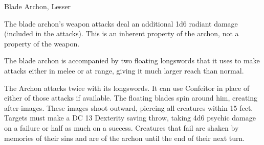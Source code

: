 \begin{DndMonster}{Blade Archon, Lesser}
	\DndMonsterBasics[armor-class={15 (scale mail)}, hit-points={60}, speed={30 ft., fly 50 ft. (hover)}]
	\DndMonsterDetails[skills={Athletics +6}, damage-resistances={radiant}, damage-immunities={poison}, senses={darkvision 60 ft., passive Perception 19}, languages={celestial}, challenge={4:3}]

	 The blade archon's weapon attacks deal an additional 1d6 radiant damage (included in the attacks). This is an inherent property of the archon, not a property of the weapon.
	
	 The blade archon is accompanied by two floating longswords that it uses to make attacks either in melee or at range, giving it much larger reach than normal.
	
	 The Archon attacks twice with its longswords. It can use Confeitor in place of either of those attacks if available.
	\DndMonsterAttack[
		name=Floating Longsword,
		distance=both,
		type=weapon,
		mod=+6,
		reach=20 ft.,
		dmg=\DndDice{1d10+4},
		dmg-type=slashing,
		plus-dmg=\DndDice{1d6},
		plus-dmg-type=radiant
	]
	 The floating blades spin around him, creating after-images. These images shoot outward, piercing all creatures within 15 feet. Targets must make a DC 13 Dexterity saving throw, taking 4d6 psychic damage on a failure or half as much on a success. Creatures that fail are shaken by memories of their sins and are  of the archon until the end of their next turn.
\end{DndMonster}


